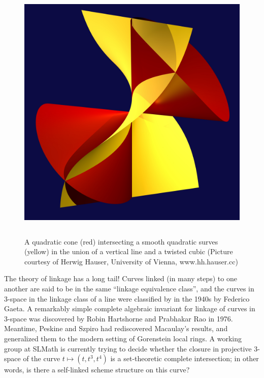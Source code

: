 \documentclass[11pt, oneside]{article}   	%
\begin{document}
\begin{figure}\label{cubicAndLine}
\centerline {\includegraphics[height=5in]{"main/Fig15-1-TwistAndShout"}}
 \caption{A quadratic cone (red) intersecting a smooth quadratic surves (yellow) in the union of a vertical line and a twisted cubic (Picture courtesy of Herwig Hauser, University of Vienna, www.hh.hauser.cc)}
\end{figure}


The theory of linkage has a long tail! Curves linked (in many steps) to one another are said to be in the same ``linkage equivalence class'', and the curves in 3-space in the linkage class of a line were classified by in the 1940s by Federico Gaeta. A remarkably simple complete algebraic invariant for linkage of curves in 3-space was discovered by Robin Hartshorne and Prabhakar Rao in 1976. 
Meantime, Peskine and Szpiro had rediscovered Macaulay's results, and generalized them to the 
modern setting of Gorenstein local rings. A working group at SLMath is currently trying to
decide whether the closure in projective 3-space of the curve $t \mapsto (t, t^{3}, t^{4})$ is a set-theoretic complete intersection; in other words, is there a self-linked scheme structure on this curve?
\end{document}
